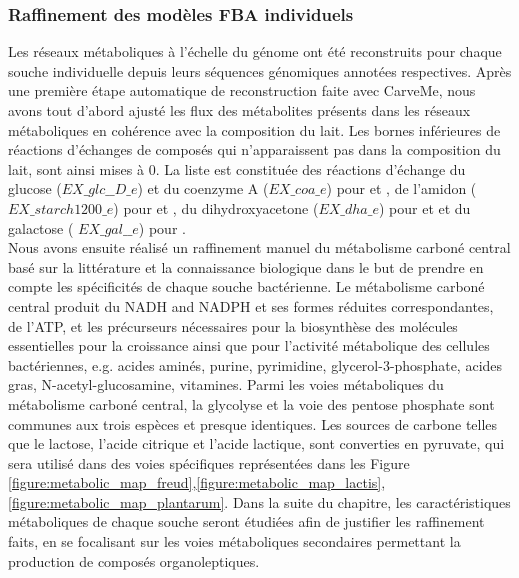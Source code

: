 \subsubsection*{Raffinement des modèles FBA individuels}
Les réseaux métaboliques à l'échelle du génome ont été reconstruits pour chaque souche individuelle depuis leurs séquences génomiques annotées respectives. Après une première étape automatique de reconstruction faite avec CarveMe, nous avons tout d'abord ajusté les flux des métabolites présents dans les réseaux métaboliques en cohérence avec la composition du lait. Les bornes inférieures de réactions d'échanges de composés qui n'apparaissent pas dans la composition du lait, sont ainsi mises à 0. La liste est constituée des réactions d'échange du glucose ($EX\_glc\_\_D\_e$) et du coenzyme A ($EX\_coa\_e$) pour \lactis et \plantarum, de l'amidon  ($EX\_starch1200\_e$) pour \lactis et \freud, du dihydroxyacetone  ($EX\_dha\_e$) pour \plantarum et \freud et du galactose ( $EX\_gal\_\_e$) pour \plantarum. \\


Nous avons ensuite réalisé un raffinement manuel du métabolisme carboné central basé sur la littérature et la connaissance biologique dans le but de prendre en compte les spécificités de chaque souche bactérienne. Le métabolisme carboné central produit du NADH and NADPH et ses formes réduites correspondantes, de l'ATP, et les précurseurs nécessaires pour la biosynthèse des molécules essentielles pour la croissance ainsi que pour l'activité métabolique des cellules bactériennes, e.g. acides aminés, purine, pyrimidine, glycerol-3-phosphate, acides gras, N-acetyl-glucosamine, vitamines. Parmi les voies métaboliques du métabolisme carboné central, la glycolyse et la voie des pentose phosphate sont communes aux trois espèces et presque identiques. Les sources de carbone telles que le lactose, l'acide citrique et l'acide lactique, sont converties en pyruvate, qui sera utilisé dans des voies spécifiques représentées dans les Figure \ref{figure:metabolic_map_freud},\ref{figure:metabolic_map_lactis},\ref{figure:metabolic_map_plantarum}. Dans la suite du chapitre, les caractéristiques métaboliques de chaque souche seront étudiées afin de justifier les raffinement faits, en se focalisant sur les voies métaboliques secondaires permettant la production de composés organoleptiques.


